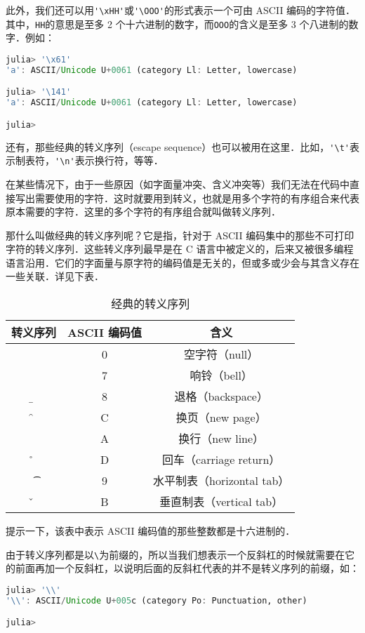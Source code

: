 此外，我们还可以用\verb|'\xHH'|或\verb|'\OOO'|的形式表示一个可由 ASCII 编码的字符值．其中，\verb|HH|的意思是至多 2 个十六进制的数字，而\verb|OOO|的含义是至多 3 个八进制的数字．例如：
\begin{lstlisting}[language=julia]
julia> '\x61'
'a': ASCII/Unicode U+0061 (category Ll: Letter, lowercase)

julia> '\141'
'a': ASCII/Unicode U+0061 (category Ll: Letter, lowercase)

julia> 
\end{lstlisting}

还有，那些经典的转义序列（escape sequence）也可以被用在这里．比如，\verb|'\t'|表示制表符，\verb|'\n'|表示换行符，等等．

在某些情况下，由于一些原因（如字面量冲突、含义冲突等）我们无法在代码中直接写出需要使用的字符．这时就要用到转义，也就是用多个字符的有序组合来代表原本需要的字符．这里的多个字符的有序组合就叫做转义序列．

那什么叫做经典的转义序列呢？它是指，针对于 ASCII 编码集中的那些不可打印字符的转义序列．这些转义序列最早是在 C 语言中被定义的，后来又被很多编程语言沿用．它们的字面量与原字符的编码值是无关的，但或多或少会与其含义存在一些关联．详见下表．
\begin{table}[ht]
\centering
\caption{经典的转义序列}\label{JuC6S2_tab1}
\begin{tabular}{|c|c|c|}
\hline
转义序列 & ASCII 编码值 & 含义 \\
\hline
\0 & 0 & 空字符（null） \\
\hline
\a & 7 & 响铃（bell） \\
\hline
\b & 8 & 退格（backspace） \\
\hline
\f & C & 换页（new page） \\
\hline
\n & A & 换行（new line） \\
\hline
\r & D & 回车（carriage return） \\
\hline
\t & 9 & 水平制表（horizontal tab） \\
\hline
\v & B & 垂直制表（vertical tab） \\
\hline
\end{tabular}
\end{table}

提示一下，该表中表示 ASCII 编码值的那些整数都是十六进制的．

由于转义序列都是以\verb|\|为前缀的，所以当我们想表示一个反斜杠的时候就需要在它的前面再加一个反斜杠，以说明后面的反斜杠代表的并不是转义序列的前缀，如：
\begin{lstlisting}[language=julia]
julia> '\\'
'\\': ASCII/Unicode U+005c (category Po: Punctuation, other)

julia> 
\end{lstlisting}

